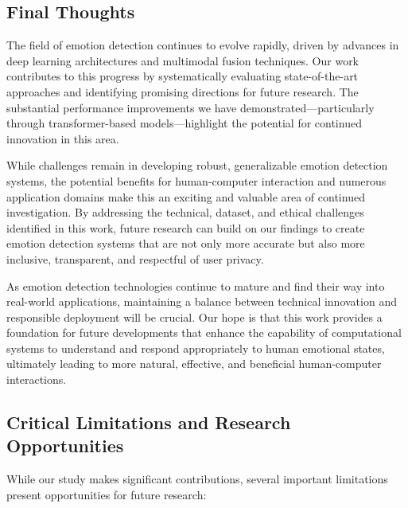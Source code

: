 \documentclass[12pt]{article}
\begin{document}
\subsection{Final Thoughts}
The field of emotion detection continues to evolve rapidly, driven by advances in deep learning architectures and multimodal fusion techniques. Our work contributes to this progress by systematically evaluating state-of-the-art approaches and identifying promising directions for future research. The substantial performance improvements we have demonstrated—particularly through transformer-based models—highlight the potential for continued innovation in this area.

While challenges remain in developing robust, generalizable emotion detection systems, the potential benefits for human-computer interaction and numerous application domains make this an exciting and valuable area of continued investigation. By addressing the technical, dataset, and ethical challenges identified in this work, future research can build on our findings to create emotion detection systems that are not only more accurate but also more inclusive, transparent, and respectful of user privacy.

As emotion detection technologies continue to mature and find their way into real-world applications, maintaining a balance between technical innovation and responsible deployment will be crucial. Our hope is that this work provides a foundation for future developments that enhance the capability of computational systems to understand and respond appropriately to human emotional states, ultimately leading to more natural, effective, and beneficial human-computer interactions.

\subsection{Critical Limitations and Research Opportunities}
While our study makes significant contributions, several important limitations present opportunities for future research:
\end{document}
